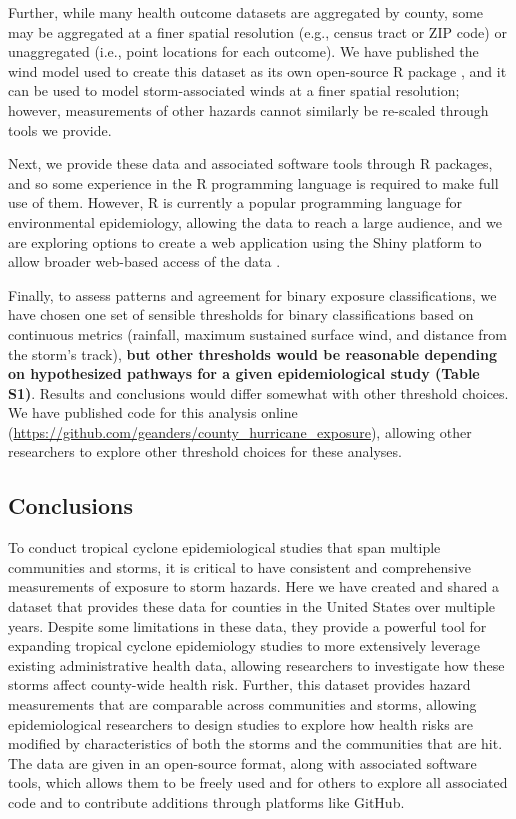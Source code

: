 Further, while many health outcome datasets are aggregated by county, 
some may be aggregated at a finer spatial resolution (e.g., census tract or ZIP
code) or unaggregated (i.e., point locations for each outcome). We have
published the wind model used to create this dataset as its own open-source R
package \parencite{stormwindmodel}, and it can be used to model
storm-associated winds at a finer spatial resolution; however, measurements of
other hazards cannot similarly be re-scaled through tools we provide. 

Next, we provide these data and associated software tools through R packages,
and so some experience in the R programming language is required to make full
use of them. However, R is currently a popular programming language for
environmental epidemiology, allowing the data to reach a large audience, and we
are exploring options to create a web application using the Shiny platform to
allow broader web-based access of the data \parencite{shiny2019}.  

Finally, to assess patterns and agreement for binary exposure classifications,
we have chosen one set of sensible thresholds for binary classifications based
on continuous metrics (rainfall, maximum sustained surface wind, and distance
from the storm's track), \textbf{but other thresholds would be reasonable
depending on hypothesized pathways for a given epidemiological study (Table
S1)}.  Results and conclusions would differ somewhat with other threshold
choices. We have published code for this analysis online
(\url{https://github.com/geanders/county_hurricane_exposure}), allowing other
researchers to explore other threshold choices for these analyses.

\subsection*{Conclusions}

To conduct tropical cyclone epidemiological studies that span multiple
communities and storms, it is critical to have consistent and comprehensive
measurements of exposure to storm hazards. Here we have created and shared a
dataset that provides these data for counties in the United States over
multiple years. Despite some limitations in these data, they provide a powerful
tool for expanding tropical cyclone epidemiology studies to more extensively
leverage existing administrative health data, allowing researchers to
investigate how these storms affect county-wide health risk.  Further, this
dataset provides hazard measurements that are comparable across communities and
storms, allowing epidemiological researchers to design studies to explore
how health risks are modified by characteristics of both the storms and the
communities that are hit. The data are given in an open-source format, along
with associated software tools, which allows them to be freely used and for
others to explore all associated code and to contribute additions through
platforms like GitHub.

